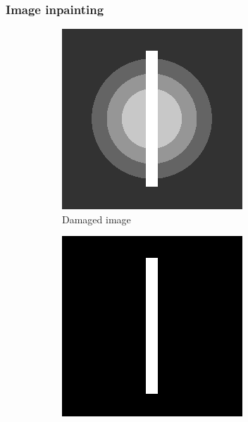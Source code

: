 \documentclass[xcolor=dvipsnames, xetex,serif]{beamer}
\begin{document}
    \begin{frame}
        \frametitle{Image inpainting} 
        \begin{figure}[H]
            \centering
            \begin{subfigure}{0.3\linewidth}
                \centering
                \includegraphics[width=0.8\linewidth]{images/grayscale_inpaint/toinpaint.png}
                \caption{Damaged image}
            \end{subfigure}
            \begin{subfigure}{0.3\linewidth}
                \centering
                \includegraphics[width=0.8\linewidth]{images/grayscale_inpaint/inpaintdomain.png}

\end{subfigure}
\end{figure}
\end{frame}
\end{document}
